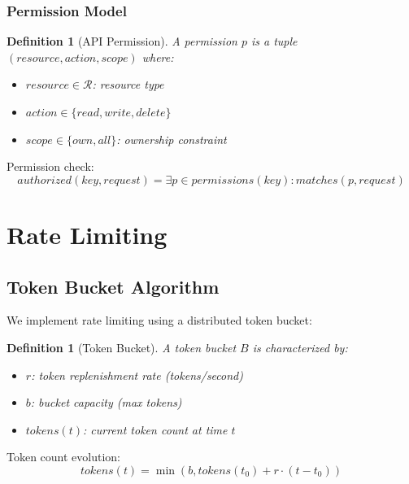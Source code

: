 \documentclass[11pt,a4paper]{article}
\newtheorem{definition}[theorem]{Definition}
\begin{document}
\subsubsection{Permission Model}

\begin{definition}[API Permission]
A permission $p$ is a tuple $(resource, action, scope)$ where:
\begin{itemize}
    \item $resource \in \mathcal{R}$: resource type
    \item $action \in \{read, write, delete\}$
    \item $scope \in \{own, all\}$: ownership constraint
\end{itemize}
\end{definition}

Permission check:
\begin{equation}
authorized(key, request) = \exists p \in permissions(key) : matches(p, request)
\end{equation}

\section{Rate Limiting}

\subsection{Token Bucket Algorithm}

We implement rate limiting using a distributed token bucket:

\begin{definition}[Token Bucket]
A token bucket $B$ is characterized by:
\begin{itemize}
    \item $r$: token replenishment rate (tokens/second)
    \item $b$: bucket capacity (max tokens)
    \item $tokens(t)$: current token count at time $t$
\end{itemize}
\end{definition}

Token count evolution:
\begin{equation}
tokens(t) = \min(b, tokens(t_0) + r \cdot (t - t_0))
\end{equation}
\end{document}
